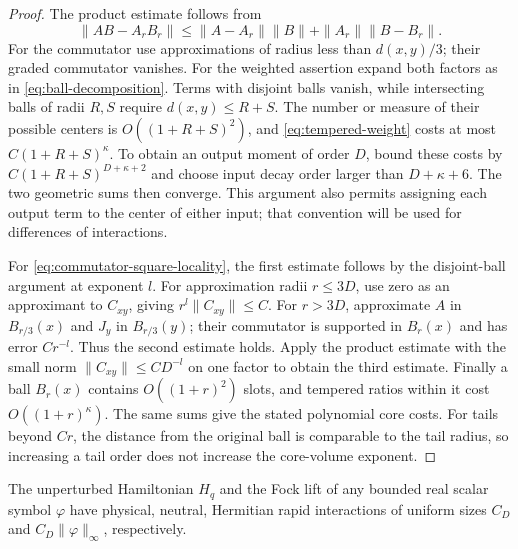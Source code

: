 \begin{proof}
The product estimate follows from
\[
 \|AB-A_rB_r\|
 \leq\|A-A_r\|\|B\|+\|A_r\|\|B-B_r\|.
\]
For the commutator use approximations of radius less than $d(x,y)/3$;
their graded commutator vanishes.  For the weighted assertion expand
both factors as in \eqref{eq:ball-decomposition}.  Terms with disjoint
balls vanish, while intersecting balls of radii $R,S$ require
$d(x,y)\leq R+S$.  The number or measure of their possible centers is
$O((1+R+S)^2)$, and \eqref{eq:tempered-weight} costs at most
$C(1+R+S)^\kappa$.  To obtain an output moment of order $D$, bound
these costs by $C(1+R+S)^{D+\kappa+2}$ and choose input decay order
larger than $D+\kappa+6$.  The two geometric sums then converge.
This argument also permits assigning each output term to the center
of either input; that convention will be used for differences of
interactions.

For \eqref{eq:commutator-square-locality}, the first estimate follows
by the disjoint-ball argument at exponent $l$.  For approximation
radii $r\leq3D$, use zero as an approximant to $C_{xy}$, giving
$r^l\|C_{xy}\|\leq C$.  For $r>3D$, approximate $A$ in $B_{r/3}(x)$
and $J_y$ in $B_{r/3}(y)$; their commutator is supported in $B_r(x)$
and has error $Cr^{-l}$.  Thus the second estimate holds.  Apply the
product estimate with the small norm $\|C_{xy}\|\leq CD^{-l}$ on one
factor to obtain the third estimate.  Finally a ball $B_r(x)$ contains
$O((1+r)^2)$ slots, and tempered ratios within it cost
$O((1+r)^\kappa)$.  The same sums give the stated polynomial core
costs.  For tails beyond $Cr$, the distance from the original ball
is comparable to the tail radius, so increasing a tail order does not
increase the core-volume exponent.
\end{proof}

\begin{corollary}\label{locality:basic-interactions}
\label{locality:toeplitz}
The unperturbed Hamiltonian $H_q$ and the Fock lift of any bounded
real scalar symbol $\varphi$ have physical, neutral, Hermitian rapid
interactions of uniform sizes $C_D$ and $C_D\|\varphi\|_\infty$,
respectively.
\end{corollary}


